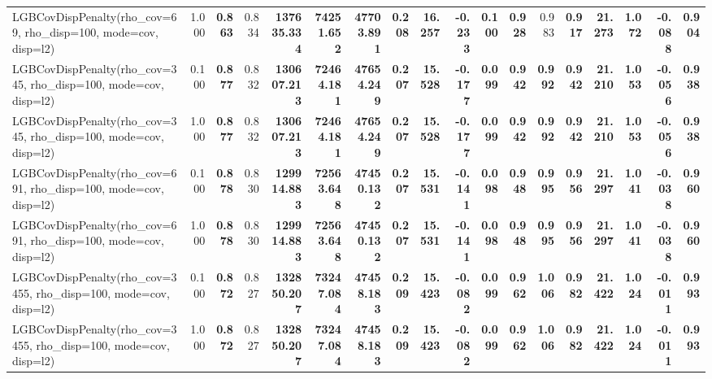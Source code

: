 \documentclass[11pt]{article}
\theoremstyle{plain}
\theoremstyle{definition}
\newcommand{\1}{\mathbf{1}}
\begin{document}
\begin{table}[htbp]
{\begin{tabular}{lrrrrrrrrrrrrrrrrr}
LGBCovDispPenalty(rho_cov=69, rho_disp=100, mode=cov, disp=l2) & 1.000 & \textbf{0.863} & 0.834 & \textbf{137635.334} & \textbf{74251.652} & \textbf{47703.891} & \textbf{0.208} & \textbf{16.257} & \textbf{-0.233} & \textbf{0.100} & \textbf{0.928} & 0.983 & \textbf{0.917} & \textbf{21.273} & \textbf{1.072} & \textbf{-0.088} & \textbf{0.904} \\
LGBCovDispPenalty(rho_cov=345, rho_disp=100, mode=cov, disp=l2) & 0.100 & \textbf{0.877} & 0.832 & \textbf{130607.213} & \textbf{72464.181} & \textbf{47654.249} & \textbf{0.207} & \textbf{15.528} & \textbf{-0.177} & \textbf{0.099} & \textbf{0.942} & \textbf{0.992} & \textbf{0.942} & \textbf{21.210} & \textbf{1.053} & \textbf{-0.056} & \textbf{0.938} \\
LGBCovDispPenalty(rho_cov=345, rho_disp=100, mode=cov, disp=l2) & 1.000 & \textbf{0.877} & 0.832 & \textbf{130607.213} & \textbf{72464.181} & \textbf{47654.249} & \textbf{0.207} & \textbf{15.528} & \textbf{-0.177} & \textbf{0.099} & \textbf{0.942} & \textbf{0.992} & \textbf{0.942} & \textbf{21.210} & \textbf{1.053} & \textbf{-0.056} & \textbf{0.938} \\
LGBCovDispPenalty(rho_cov=691, rho_disp=100, mode=cov, disp=l2) & 0.100 & \textbf{0.878} & 0.830 & \textbf{129914.883} & \textbf{72563.648} & \textbf{47450.132} & \textbf{0.207} & \textbf{15.531} & \textbf{-0.141} & \textbf{0.098} & \textbf{0.948} & \textbf{0.995} & \textbf{0.956} & \textbf{21.297} & \textbf{1.041} & \textbf{-0.038} & \textbf{0.960} \\
LGBCovDispPenalty(rho_cov=691, rho_disp=100, mode=cov, disp=l2) & 1.000 & \textbf{0.878} & 0.830 & \textbf{129914.883} & \textbf{72563.648} & \textbf{47450.132} & \textbf{0.207} & \textbf{15.531} & \textbf{-0.141} & \textbf{0.098} & \textbf{0.948} & \textbf{0.995} & \textbf{0.956} & \textbf{21.297} & \textbf{1.041} & \textbf{-0.038} & \textbf{0.960} \\
LGBCovDispPenalty(rho_cov=3455, rho_disp=100, mode=cov, disp=l2) & 0.100 & \textbf{0.872} & 0.827 & \textbf{132850.207} & \textbf{73247.084} & \textbf{47458.183} & \textbf{0.209} & \textbf{15.423} & \textbf{-0.082} & \textbf{0.099} & \textbf{0.962} & \textbf{1.006} & \textbf{0.982} & \textbf{21.422} & \textbf{1.024} & \textbf{-0.011} & \textbf{0.993} \\
LGBCovDispPenalty(rho_cov=3455, rho_disp=100, mode=cov, disp=l2) & 1.000 & \textbf{0.872} & 0.827 & \textbf{132850.207} & \textbf{73247.084} & \textbf{47458.183} & \textbf{0.209} & \textbf{15.423} & \textbf{-0.082} & \textbf{0.099} & \textbf{0.962} & \textbf{1.006} & \textbf{0.982} & \textbf{21.422} & \textbf{1.024} & \textbf{-0.011} & \textbf{0.993} \\

\end{tabular}}
\end{table}
\end{document}

